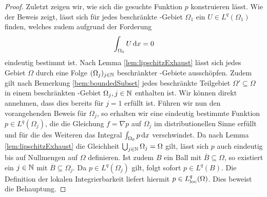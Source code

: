 \begin{proof}
  Zuletzt zeigen wir, wie sich die gesuchte Funktion $p$ konstruieren lässt.
  Wie der Beweis zeigt, lässt sich für jedes beschränkte \lipschitz\hyp{}Gebiet $\Omega_1$ ein $U \in L^q(\Omega_1)$ finden, welches zudem aufgrund der Forderung 
  $$
  \int_{\Omega_0} U \, {\operatorname{d}\!{x}} = 0
  $$
  eindeutig bestimmt ist.
  Nach Lemma \ref{lem:lipschitzExhaust} lässt sich jedes Gebiet $\Omega$ durch eine Folge $(\Omega_j)_{j \in \mathbb{N}}$ beschränkter \lipschitz\hyp{}Gebiete ausschöpfen.
  Zudem gilt nach Bemerkung \ref{bem:boundedSubset} jedes beschränkte Teilgebiet $\Omega' \subseteq \Omega$ in einem beschränkten \lipschitz\hyp{}Gebiet $\Omega_j, j \in \mathbb{N}$ enthalten ist.
  Wir können direkt annehmen, dass dies bereits für $j = 1$ erfüllt ist.
  Führen wir nun den vorangehenden Beweis für $\Omega_j$, so erhalten wir eine eindeutig bestimmte Funktion $p \in L^q(\Omega_j)$, die die Gleichung $f = \nabla p$ auf $\Omega_j$ im distributionellen Sinne erfüllt und für die des Weiteren das Integral $\int_{\Omega_0} p \, {\operatorname{d}\!{x}}$ verschwindet.
  Da nach Lemma \ref{lem:lipschitzExhaust} die Gleichheit $\bigcup_{j \in \mathbb{N}} \Omega_j = \Omega$ gilt, lässt sich $p$ auch eindeutig bis auf Nullmengen auf $\Omega$ definieren.
  Ist zudem $B$ ein Ball mit $\overline B \subseteq \Omega$, so existiert ein $j \in \mathbb{N}$ mit $\overline B \subseteq \Omega_j$.
  Da $p \in L^q(\Omega_j)$ gilt, folgt sofort $p \in L^q(B)$.
  Die Definition der lokalen Integrierbarkeit liefert hiermit $p \in L^q_{\operatorname{loc}}(\Omega)$.
  Dies beweist die Behauptung.
\end{proof}
